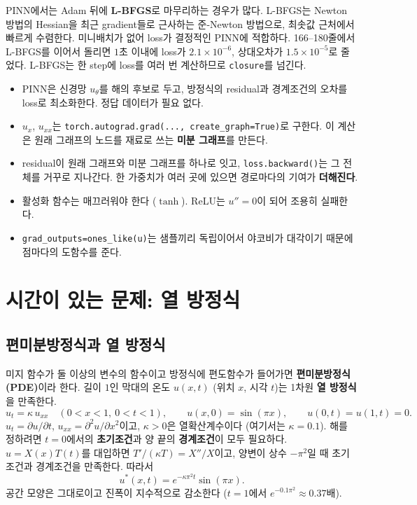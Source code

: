 \documentclass[11pt,a4paper]{article}
\begin{document}
\begin{remarkbox}
PINN에서는 Adam 뒤에 \textbf{L-BFGS}로 마무리하는 경우가 많다.
L-BFGS는 Newton 방법의 Hessian을 최근 gradient들로 근사하는 준-Newton 방법으로, 최솟값 근처에서 빠르게 수렴한다.
미니배치가 없어 loss가 결정적인 PINN에 적합하다. 166--180줄에서 L-BFGS를 이어서 돌리면 $1$초 이내에 loss가 $2.1\times10^{-6}$,
상대오차가 $1.5\times10^{-5}$로 줄었다. L-BFGS는 한 step에 loss를 여러 번 계산하므로 \texttt{closure}를 넘긴다.
\end{remarkbox}

\begin{keybox}[중간 정리]
\begin{itemize}[leftmargin=1.5em]
\item PINN은 신경망 $u_\theta$를 해의 후보로 두고, 방정식의 residual과 경계조건의 오차를 loss로 최소화한다. 정답 데이터가 필요 없다.
\item $u_x$, $u_{xx}$는 \texttt{torch.autograd.grad(..., create\_graph=True)}로 구한다. 이 계산은 원래 그래프의 노드를 재료로 쓰는 \textbf{미분 그래프}를 만든다.
\item residual이 원래 그래프와 미분 그래프를 하나로 잇고, \texttt{loss.backward()}는 그 전체를 거꾸로 지나간다.
한 가중치가 여러 곳에 있으면 경로마다의 기여가 \textbf{더해진다}.
\item 활성화 함수는 매끄러워야 한다 ($\tanh$). ReLU는 $u''=0$이 되어 조용히 실패한다.
\item \texttt{grad\_outputs=ones\_like(u)}는 샘플끼리 독립이어서 야코비가 대각이기 때문에 점마다의 도함수를 준다.
\end{itemize}
\end{keybox}

\section{시간이 있는 문제: 열 방정식}\label{sec:heat}

\subsection{편미분방정식과 열 방정식}

미지 함수가 둘 이상의 변수의 함수이고 방정식에 편도함수가 들어가면 \textbf{편미분방정식 (PDE)}이라 한다.
길이 $1$인 막대의 온도 $u(x,t)$ (위치 $x$, 시각 $t$)는 1차원 \textbf{열 방정식}을 만족한다.
\begin{equation}\label{eq:heat}
u_t=\kappa\,u_{xx}\quad(0<x<1,\ 0<t<1),\qquad u(x,0)=\sin(\pi x),\qquad u(0,t)=u(1,t)=0.
\end{equation}
$u_t=\partial u/\partial t$, $u_{xx}=\partial^2u/\partial x^2$이고, $\kappa>0$은 열확산계수이다 (여기서는 $\kappa=0.1$).
해를 정하려면 $t=0$에서의 \textbf{초기조건}과 양 끝의 \textbf{경계조건}이 모두 필요하다.
$u=X(x)T(t)$를 대입하면 $T'/(\kappa T)=X''/X$이고, 양변이 상수 $-\pi^2$일 때 초기조건과 경계조건을 만족한다. 따라서
\[
u^*(x,t)=e^{-\kappa\pi^2t}\sin(\pi x).
\]
공간 모양은 그대로이고 진폭이 지수적으로 감소한다 ($t=1$에서 $e^{-0.1\pi^2}\approx0.37$배).
\end{document}
